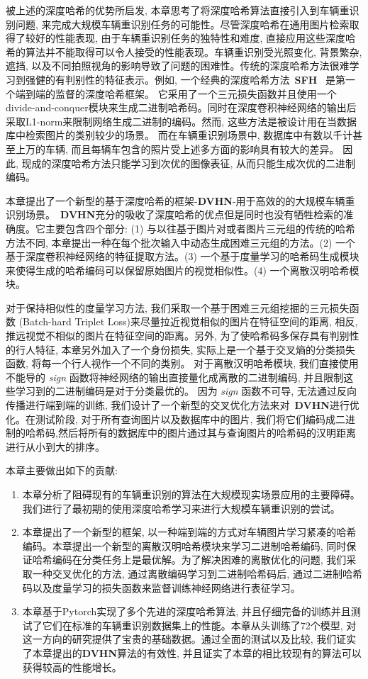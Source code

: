 被上述的深度哈希的优势所启发, 本章思考了将深度哈希算法直接引入到车辆重识别问题, 来完成大规模车辆重识别任务的可能性。尽管深度哈希在通用图片检索取得了较好的性能表现, 由于车辆重识别任务的独特性和难度, 直接应用这些深度哈希的算法并不能取得可以令人接受的性能表现。车辆重识别受光照变化, 背景繁杂, 遮挡, 以及不同拍照视角的影响导致了问题的困难性。传统的深度哈希方法很难学习到强健的有判别性的特征表示。例如, 一个经典的深度哈希方法~\textbf{SFH}~\cite{lai2015simultaneous} 是第一个端到端的监督的深度哈希框架。 它采用了一个三元损失函数并且使用一个divide-and-conquer模块来生成二进制哈希码。同时在深度卷积神经网络的输出后采取L1-norm来限制网络生成二进制的编码。然而, 这些方法是被设计用在当数据库中检索图片的类别较少的场景。 而在车辆重识别场景中, 数据库中有数以千计甚至上万的车辆, 而且每辆车包含的照片受上述多方面的影响具有较大的差异。 因此, 现成的深度哈希方法只能学习到次优的图像表征, 从而只能生成次优的二进制编码。\par
本章提出了一个新型的基于深度哈希的框架-\textbf{DVHN}-用于高效的的大规模车辆重识别场景。~\textbf{DVHN}充分的吸收了深度哈希的优点但是同时也没有牺牲检索的准确度。它主要包含四个部分: (1) 与以往基于图片对或者图片三元组的传统的哈希方法不同, 本章提出一种在每个批次输入中动态生成困难三元组的方法。(2) 一个基于深度卷积神经网络的特征提取方法。(3) 一个基于度量学习的哈希码生成模块来使得生成的哈希编码可以保留原始图片的视觉相似性。(4) 一个离散汉明哈希模块。 \par
对于保持相似性的度量学习方法, 我们采取一个基于困难三元组挖掘的三元损失函数 (Batch-hard Triplet Loss)来尽量拉近视觉相似的图片在特征空间的距离, 相反, 推远视觉不相似的图片在特征空间的距离。另外, 为了使哈希码多保存具有判别性的行人特征, 本章另外加入了一个身份损失, 实际上是一个基于交叉熵的分类损失函数, 将每一个行人视作一个不同的类别。 对于离散汉明哈希模块, 我们直接使用不能导的 \textit{sign} 函数将神经网络的输出直接量化成离散的二进制编码, 并且限制这些学习到的二进制编码是对于分类最优的。 因为 \textit{sign} 函数不可导, 无法通过反向传播进行端到端的训练, 我们设计了一个新型的交叉优化方法来对~\textbf{DVHN}进行优化。在测试阶段, 对于所有查询图片以及数据库中的图片, 我们将它们编码成二进制的哈希码,然后将所有的数据库中的图片通过其与查询图片的哈希码的汉明距离进行从小到大的排序。 \par
本章主要做出如下的贡献:
\begin{enumerate}
    \item 本章分析了阻碍现有的车辆重识别的算法在大规模现实场景应用的主要障碍。我们进行了最初期的使用深度哈希学习来进行大规模车辆重识别的尝试。
    \item 本章提出了一个新型的框架, 以一种端到端的方式对车辆图片学习紧凑的哈希编码。本章提出一个新型的离散汉明哈希模块来学习二进制哈希编码, 同时保证哈希编码在分类任务上是最优解。为了解决困难的离散优化的问题, 我们采取一种交叉优化的方法, 通过离散编码学习到二进制哈希码后, 通过二进制哈希码以及度量学习的损失函数来监督训练神经网络进行表征学习。
    \item 本章基于Pytorch实现了多个先进的深度哈希算法, 并且仔细完备的训练并且测试了它们在标准的车辆重识别数据集上的性能。本章从头训练了72个模型, 对这一方向的研究提供了宝贵的基础数据。通过全面的测试以及比较, 我们证实了本章提出的\textbf{DVHN}算法的有效性, 并且证实了本章的相比较现有的算法可以获得较高的性能增长。
\end{enumerate}

